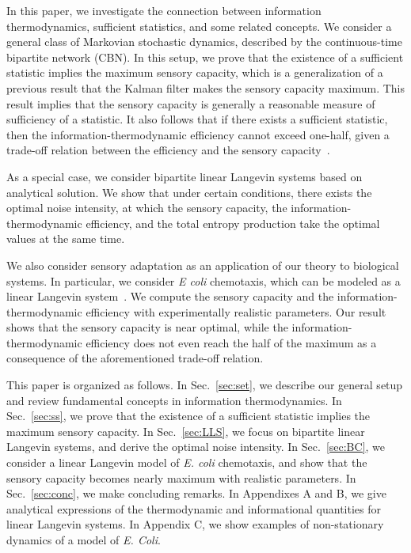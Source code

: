 \documentclass[%
 reprint,
 amsmath,amssymb,
 aps,
]{revtex4-1}
\theoremstyle{plain}
\begin{document}
In this paper, we investigate the connection between information thermodynamics, sufficient statistics, and some related concepts. We consider a general class of Markovian stochastic dynamics, described by the continuous-time bipartite network (CBN). In this setup, we prove that the existence of a sufficient statistic implies the maximum sensory capacity, which is a generalization of a previous result that the Kalman filter makes the sensory capacity maximum. This result implies that the sensory capacity is generally a reasonable measure of sufficiency of a statistic. It also follows that if there exists a sufficient statistic, then the information-thermodynamic efficiency cannot exceed one-half, given a trade-off relation between the efficiency and the sensory capacity~\cite{Hartich2016,phd}.

As a special case, we consider bipartite linear Langevin systems based on analytical solution. We show that under certain conditions, there exists the optimal noise intensity, at which the sensory capacity, the information-thermodynamic efficiency, and the total entropy production take the optimal values at the same time. 

We also consider sensory adaptation as an application of our theory to biological systems. In particular, we consider {\it E coli} chemotaxis, which can be modeled as a linear Langevin system~\cite{Barkai1997,Tu2008,Lan2012}. We compute the sensory capacity and the information-thermodynamic efficiency with experimentally realistic parameters. Our result shows that the sensory capacity is near optimal, while the information-thermodynamic efficiency           
does not even reach the half of the maximum as a consequence of the aforementioned trade-off relation. 

This paper is organized as follows. In Sec.~\ref{sec:set}, we describe our general setup and review fundamental concepts in information thermodynamics. In Sec.~\ref{sec:ss}, we prove that the existence of a sufficient statistic implies the maximum sensory capacity. In Sec.~\ref{sec:LLS}, we focus on bipartite linear Langevin systems, and derive the optimal noise intensity. In Sec.~\ref{sec:BC}, we consider a linear Langevin model of {\it E. coli} chemotaxis, and show that the sensory capacity becomes nearly maximum with realistic parameters. In Sec.~\ref{sec:conc}, we make concluding remarks. In Appendixes A and B, we give analytical expressions of the thermodynamic and informational quantities for linear Langevin systems. In Appendix C, we show examples of non-stationary dynamics of  a model of {\it E. Coli}.
\end{document}

